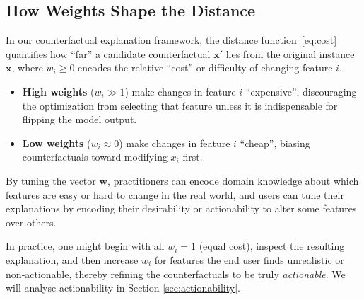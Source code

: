 \documentclass[12pt]{extarticle}
\numberwithin{equation}{section}
\begin{document}
\subsection{How Weights Shape the Distance}\label{sec:weights}
In our counterfactual explanation framework, the distance function~\eqref{eq:cost} quantifies how “far” a candidate counterfactual \(\mathbf{x}'\) lies from the original instance \(\mathbf{x}\), where \(w_i \ge 0\) encodes the relative “cost” or difficulty of changing feature \(i\).

\begin{itemize}
  \item \textbf{High weights} (\(w_i \!\!\gg\! 1\)) make changes in feature \(i\) “expensive”, discouraging the optimization from selecting that feature unless it is indispensable for flipping the model output.
  \item \textbf{Low weights} (\(w_i \!\!\approx\! 0\)) make changes in feature \(i\) “cheap”, biasing counterfactuals toward modifying \(x_i\) first.
\end{itemize}
By tuning the vector \(\mathbf{w}\), practitioners can encode domain knowledge about which features are easy or hard to change in the real world, and users can tune their explanations by encoding their desirability or actionability to alter some features over others.

In practice, one might begin with all $w_i = 1$ (equal cost), inspect the resulting explanation, and then increase $w_i$ for features the end user finds unrealistic or non‐actionable, thereby refining the counterfactuals to be truly \emph{actionable}. We will analyse actionability in Section \ref{sec:actionability}.
\end{document}
